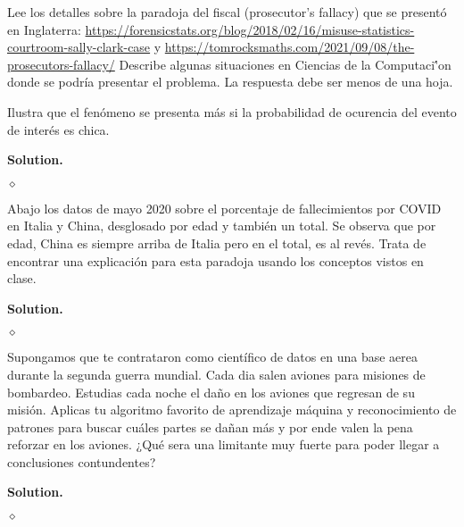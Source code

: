 \documentclass{article}
\theoremstyle{problemstyle}
\newenvironment{solution}{%
  \begin{mdframed}[linewidth=0.8pt,linecolor=Gray,backgroundcolor=Gray!5,roundcorner=5pt, nobreak=true]%
  \noindent\textbf{Solution.}%
}{%
\hfill $ \diamond $ 
  \end{mdframed}%
}
\begin{document}
\begin{problem}
Lee los detalles sobre la paradoja del fiscal (prosecutor’s fallacy) que se
present\'o en Inglaterra: \url{https://forensicstats.org/blog/2018/02/16/misuse-statistics-courtroom-sally-clark-case} y \url{https://tomrocksmaths.com/2021/09/08/the-prosecutors-fallacy/}
Describe algunas situaciones en Ciencias de la Computaci\''on donde se podr\'ia presentar el problema. La respuesta debe ser menos de una hoja.

Ilustra que el fen\'omeno se presenta m\'as si la probabilidad de ocurencia
del evento de inter\'es es chica.

\end{problem}

\begin{solution}

\end{solution}

\begin{problem}
Abajo los datos de mayo 2020 sobre el porcentaje de fallecimientos por COVID en Italia y China, desglosado por edad y tambi\'en un total. Se observa que por edad, China es siempre arriba de Italia pero en el total, es al rev\'es. Trata de encontrar una explicaci\'on para esta paradoja usando los conceptos vistos en clase.
\end{problem}
\begin{solution}

\end{solution}

\begin{problem}
Supongamos que te contrataron como cient\'ifico de datos en una base aerea
durante la segunda guerra mundial. Cada dia salen aviones para misiones
de bombardeo. Estudias cada noche el da\~no en los aviones que regresan
de su misi\'on. Aplicas tu algoritmo favorito de aprendizaje m\'aquina y
reconocimiento de patrones para buscar cu\'ales partes se da\~nan m\'as y por
ende valen la pena reforzar en los aviones. ¿Qu\'e sera una limitante muy
fuerte para poder llegar a conclusiones contundentes?
\end{problem}
\begin{solution}

\end{solution}
\end{document}
